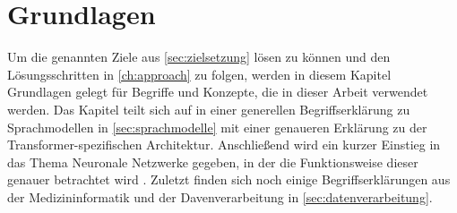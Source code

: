 \chapter{Grundlagen}\label{ch:preliminaries}








Um die genannten Ziele aus \cref{sec:zielsetzung} lösen zu können und den Lösungsschritten in \cref{ch:approach} zu folgen, werden in diesem Kapitel Grundlagen gelegt für Begriffe und Konzepte, die in dieser Arbeit verwendet werden.
Das Kapitel teilt sich auf in einer generellen Begriffserklärung zu Sprachmodellen in \cref{sec:sprachmodelle} mit einer genaueren Erklärung zu der Transformer-spezifischen Architektur.
Anschließend wird ein kurzer Einstieg in das Thema Neuronale Netzwerke gegeben, in der die Funktionsweise dieser genauer betrachtet wird .
Zuletzt finden sich noch einige Begriffserklärungen aus der Medizininformatik und der Davenverarbeitung in \cref{sec:datenverarbeitung}.

